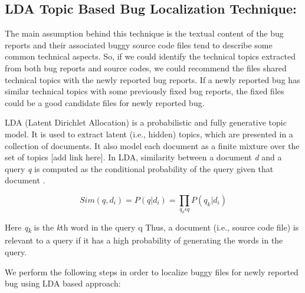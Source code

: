 \documentclass[conference]{IEEEtran}
\begin{document}
\subsection{LDA Topic Based Bug Localization Technique:}
The main assumption behind this technique is the textual content of the bug reports and their associated buggy source code files tend to describe some common technical aspects. So, if  we could identify the technical topics extracted from both bug reports and source codes, we could recommend the files shared technical topics with the newly reported bug reports. If a newly reported bug has similar technical topics with some previously fixed bug reports, the fixed files could be a good candidate files for newly reported bug.

LDA (Latent Dirichlet Allocation) is a probabilistic and fully generative topic model. It is used to extract latent (i.e., hidden) topics, which are presented in a collection of documents. It also model each document as a finite mixture over the set of topics [add link here]. In LDA, similarity between a document \textit{d} and a query \textit{q} is computed as the conditional probability of the query given that document \cite{Lukins2}.

\begin{equation}
Sim(q,d_{i})=P(q|d_{i})=\prod_{q_{k}\epsilon q}P(q_{k}|d_{i})
\end{equation}

Here \textit{q\textsubscript{k}} is the \textit{k}th word in the query {q} Thus, a document (i.e., source code file) is relevant to a query if it has a high probability of generating the words in the query.

We perform the following steps in order to localize buggy files for newly reported bug using LDA based approach:
\end{document}
